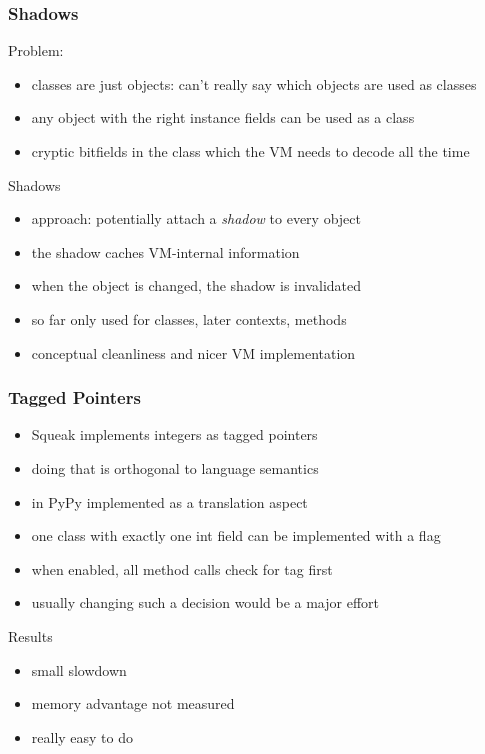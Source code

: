 \documentclass[utf8x]{beamer}
\begin{document}
\begin{frame}
    \frametitle{Shadows}
    Problem: 
    \begin{itemize}
    \item classes are just objects: can't really say which objects are used as classes
    \item any object with the right instance fields can be used as a class
    \item cryptic bitfields in the class which the VM needs to decode all the time
    \end{itemize}
    \pause
    \begin{block}{Shadows}
        \begin{itemize}
        \item approach: potentially attach a \emph{shadow} to every object
        \item the shadow caches VM-internal information
        \item when the object is changed, the shadow is invalidated
        \item so far only used for classes, later contexts, methods
        \item conceptual cleanliness and nicer VM implementation
        \end{itemize}
    \end{block}
\end{frame}

\begin{frame}
    \frametitle{Tagged Pointers}
    \begin{itemize}
    \item Squeak implements integers as tagged pointers
    \item doing that is orthogonal to language semantics
    \item in PyPy implemented as a translation aspect
    \item one class with exactly one int field can be implemented with a flag
    \item when enabled, all method calls check for tag first
    \item usually changing such a decision would be a major effort
    \end{itemize}
    \pause
    \begin{block}{Results}
        \begin{itemize}
        \item small slowdown
        \item memory advantage not measured
        \item really easy to do
        \end{itemize}
    \end{block}
\end{frame}
\end{document}
